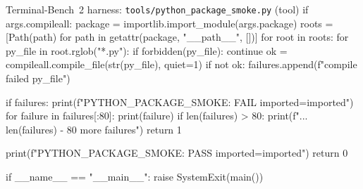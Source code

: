 \begin{promptbox}{Terminal-Bench~2 harness: \texttt{tools/python\_package\_smoke.py} (tool)}
    if args.compileall:
        package = importlib.import_module(args.package)
        roots = [Path(path) for path in getattr(package, "__path__", [])]
        for root in roots:
            for py_file in root.rglob("*.py"):
                if forbidden(py_file):
                    continue
                ok = compileall.compile_file(str(py_file), quiet=1)
                if not ok:
                    failures.append(f"compile failed {py_file}")

    if failures:
        print(f"PYTHON_PACKAGE_SMOKE: FAIL imported={imported}")
        for failure in failures[:80]:
            print(failure)
        if len(failures) > 80:
            print(f"... {len(failures) - 80} more failures")
        return 1

    print(f"PYTHON_PACKAGE_SMOKE: PASS imported={imported}")
    return 0


if __name__ == "__main__":
    raise SystemExit(main())
\end{promptbox}

